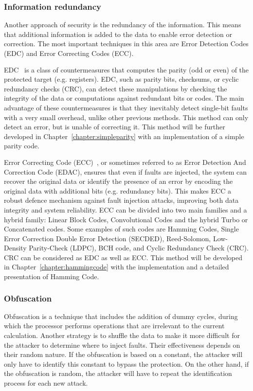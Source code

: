 \subsubsection{Information redundancy}
Another approach of security is the redundancy of the information. This means that additional information is added to the data to enable error detection or correction. The most important techniques in this area are Error Detection Codes (EDC) and Error Correcting Codes (ECC).

EDC~\cite{APHBML-16-date,MKBM-14-sta,BBKMP-03-toc} is a class of countermeasures that computes the parity (odd or even) of the protected target (e.g. registers). EDC, such as parity bits, checksums, or cyclic redundancy checks (CRC), can detect these manipulations by checking the integrity of the data or computations against redundant bits or codes. The main advantage of these countermeasures is that they inevitably detect single-bit faults with a very small overhead, unlike other previous methods. This method can only detect an error, but is unable of correcting it. This method will be further developed in Chapter~\ref{chapter:simpleparity} with an implementation of a simple parity code.

Error Correcting Code (ECC)~\cite{PTCVAJ-20-iscas,DGMMNM-20-arcs,CB-06-toc}, or sometimes referred to as Error Detection And Correction Code (EDAC), ensures that even if faults are injected, the system can recover the original data or identify the presence of an error by encoding the original data with additional bits (e.g. redundancy bits). This makes ECC a robust defence mechanism against fault injection attacks, improving both data integrity and system reliability. ECC can be divided into two main families and a hybrid family: Linear Block Codes, Convolutional Codes and the hybrid Turbo or Concatenated codes. Some examples of such codes are Hamming Codes, Single Error Correction Double Error Detection (SECDED), Reed-Solomon, Low-Density Parity-Check (LDPC), BCH code, and Cyclic Redundancy Check (CRC). CRC can be considered as EDC as well as ECC. This method will be developed in Chapter~\ref{chapter:hammingcode} with the implementation and a detailed presentation of Hamming Code.

\subsubsection{Obfuscation}
Obfuscation is a technique that includes the addition of dummy cycles, during which the processor performs operations that are irrelevant to the current calculation. Another strategy is to shuffle the data to make it more difficult for the attacker to determine where to inject faults. Their effectiveness depends on their random nature. If the obfuscation is based on a constant, the attacker will only have to identify this constant to bypass the protection. On the other hand, if the obfuscation is random, the attacker will have to repeat the identification process for each new attack.

